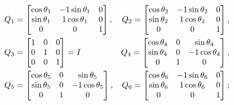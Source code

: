 \documentclass[conference]{IEEEtran}
\begin{document}
\begin{small}
    \begin{align*}
         & Q_1 = \begin{bmatrix}
                     \cos \theta_1 & - 1 \sin \theta_1 & 0 \\
                     \sin \theta_1 & 1 \cos \theta_1   & 0 \\
                     0             & 0                 & 1
                 \end{bmatrix} ,
         & Q_2 = \begin{bmatrix}
                     \cos \theta_2 & - 1 \sin \theta_2 & 0 \\
                     \sin \theta_2 & 1 \cos \theta_2   & 0 \\
                     0             & 0                 & 1
                 \end{bmatrix} , \\
         & Q_3 = \begin{bmatrix}
                     1 & 0 & 0 \\
                     0 & 1 & 0 \\
                     0 & 0 & 1
                 \end{bmatrix} = \emph{I}
         & Q_4 = \begin{bmatrix}
                     \cos \theta_4 & 0 & \sin \theta_4     \\
                     \sin \theta_4 & 0 & - 1 \cos \theta_4 \\
                     0             & 1 & 0
                 \end{bmatrix} , \\
         & Q_5 = \begin{bmatrix}
                     \cos \theta_5 & 0 & \sin \theta_5     \\
                     \sin \theta_5 & 0 & - 1 \cos \theta_5 \\
                     0             & 1 & 0
                 \end{bmatrix} ,
         & Q_6 = \begin{bmatrix}
                     \cos \theta_6 & - 1 \sin \theta_6 & 0 \\
                     \sin \theta_6 & 1 \cos \theta_6   & 0 \\
                     0             & 0                 & 1
                 \end{bmatrix} ; \\

\end{align*}
\end{small}
\end{document}
